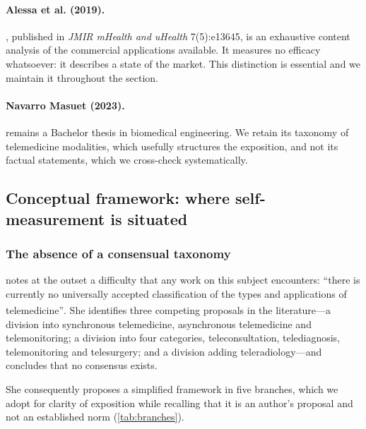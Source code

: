 \documentclass[12pt,a4paper,oneside]{report}
\newcommand{\bq}[1]{``#1''\textsuperscript{\dag}}
\begin{document}
\paragraph{Alessa et al. (2019).} \textcite{alessa2019}, published in \emph{JMIR mHealth and uHealth} 7(5):e13645, is an exhaustive content analysis of the commercial applications available. It measures no efficacy whatsoever: it describes a state of the market. This distinction is essential and we maintain it throughout the section.

\paragraph{Navarro Masuet (2023).} \textcite{navarro2023} remains a Bachelor thesis in biomedical engineering. We retain its taxonomy of telemedicine modalities, which usefully structures the exposition, and not its factual statements, which we cross-check systematically.

\subsection{Conceptual framework: where self-measurement is situated}\label{sec:framework}

\subsubsection{The absence of a consensual taxonomy}

\textcite{navarro2023} notes at the outset a difficulty that any work on this subject encounters: \bq{there is currently no universally accepted classification of the types and applications of telemedicine}. She identifies three competing proposals in the literature---a division into synchronous telemedicine, asynchronous telemedicine and telemonitoring; a division into four categories, teleconsultation, telediagnosis, telemonitoring and telesurgery; and a division adding teleradiology---and concludes that no consensus exists.

She consequently proposes a simplified framework in five branches, which we adopt for clarity of exposition while recalling that it is an author's proposal and not an established norm (\cref{tab:branches}).
\end{document}
